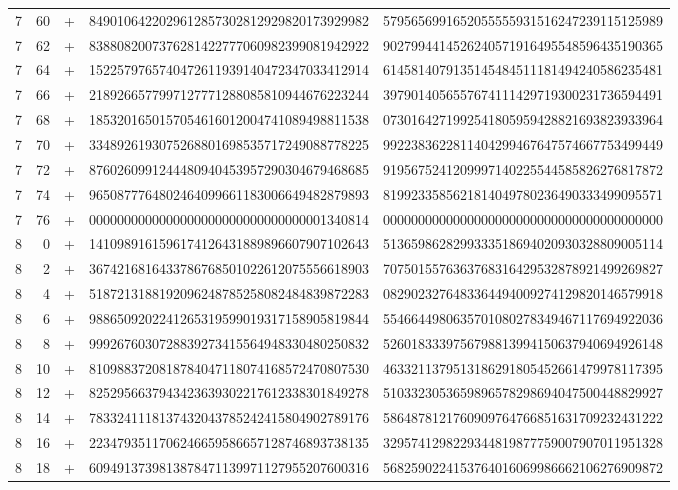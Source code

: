 \begin{longtable}{rrrll}
7 & 60 & + & 8490106422029612857302812929820173929982 & 5795656991652055555931516247239115125989 \\
7 & 62 & + & 8388082007376281422777060982399081942922 & 9027994414526240571916495548596435190365 \\
7 & 64 & + & 1522579765740472611939140472347033412914 & 6145814079135145484511181494240586235481 \\
7 & 66 & + & 2189266577997127771288085810944676223244 & 3979014056557674111429719300231736594491 \\
7 & 68 & + & 1853201650157054616012004741089498811538 & 0730164271992541805959428821693823933964 \\
7 & 70 & + & 3348926193075268801698535717249088778225 & 9922383622811404299467647574667753499449 \\
7 & 72 & + & 8760260991244480940453957290304679468685 & 9195675241209997140225544585826276817872 \\
7 & 74 & + & 9650877764802464099661183006649482879893 & 8199233585621814049780236490333499095571 \\
7 & 76 & + & 0000000000000000000000000000000001340814 & 0000000000000000000000000000000000000000 \\
8 & 0 & + & 1410989161596174126431889896607907102643 & 5136598628299333518694020930328809005114 \\
8 & 2 & + & 3674216816433786768501022612075556618903 & 7075015576363768316429532878921499269827 \\
8 & 4 & + & 5187213188192096248785258082484839872283 & 0829023276483364494009274129820146579918 \\
8 & 6 & + & 9886509202241265319599019317158905819844 & 5546644980635701080278349467117694922036 \\
8 & 8 & + & 9992676030728839273415564948330480250832 & 5260183339756798813994150637940694926148 \\
8 & 10 & + & 8109883720818784047118074168572470807530 & 4633211379513186291805452661479978117395 \\
8 & 12 & + & 8252956637943423639302217612338301849278 & 5103323053659896578298694047500448829927 \\
8 & 14 & + & 7833241118137432043785242415804902789176 & 5864878121760909764766851631709232431222 \\
8 & 16 & + & 2234793511706246659586657128746893738135 & 3295741298229344819877759007907011951328 \\
8 & 18 & + & 6094913739813878471139971127955207600316 & 5682590224153764016069986662106276909872 \\

\end{longtable}
